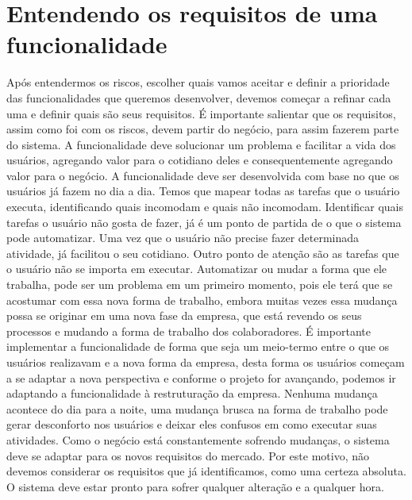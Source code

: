       \section{Entendendo os requisitos de uma funcionalidade}
        Após entendermos os riscos, escolher quais vamos aceitar e definir a prioridade
        das funcionalidades que queremos desenvolver, devemos começar a refinar cada
        uma e definir quais são seus requisitos. É importante salientar que os
        requisitos, assim como foi com os riscos, devem partir do negócio, para assim
        fazerem parte do sistema. A funcionalidade deve solucionar um problema e facilitar
        a vida dos usuários, agregando valor para o cotidiano deles e consequentemente
        agregando valor para o negócio. \newline
        A funcionalidade deve ser desenvolvida com base no que os usuários já fazem
        no dia a dia. Temos que mapear todas as tarefas que o usuário executa,
        identificando quais incomodam e quais não incomodam. Identificar quais tarefas
        o usuário não gosta de fazer, já é um ponto de partida de o que o sistema pode
        automatizar. Uma vez que o usuário não precise fazer determinada atividade,
        já facilitou o seu cotidiano. Outro ponto de atenção são as tarefas que
        o usuário não se importa em executar. Automatizar ou mudar a forma que ele
        trabalha, pode ser um problema em um primeiro momento, pois ele terá que
        se acostumar com essa nova forma de trabalho, embora muitas vezes essa mudança
        possa se originar em uma nova fase da empresa, que está revendo os seus processos
        e mudando a forma de trabalho dos colaboradores. É importante implementar
        a funcionalidade de forma que seja um meio-termo entre o que os usuários
        realizavam e a nova forma da empresa, desta forma os usuários começam a
        se adaptar a nova perspectiva e conforme o projeto for avançando, podemos
        ir adaptando a funcionalidade à restruturação da empresa. Nenhuma mudança
        acontece do dia para a noite, uma mudança brusca na forma de trabalho
        pode gerar desconforto nos usuários e deixar eles confusos em como executar
        suas atividades. \newline
        Como o negócio está constantemente sofrendo mudanças, o sistema deve se
        adaptar para os novos requisitos do mercado. Por este motivo, não devemos
        considerar os requisitos que já identificamos, como uma certeza absoluta.
        O sistema deve estar pronto para sofrer qualquer alteração e a qualquer hora.
